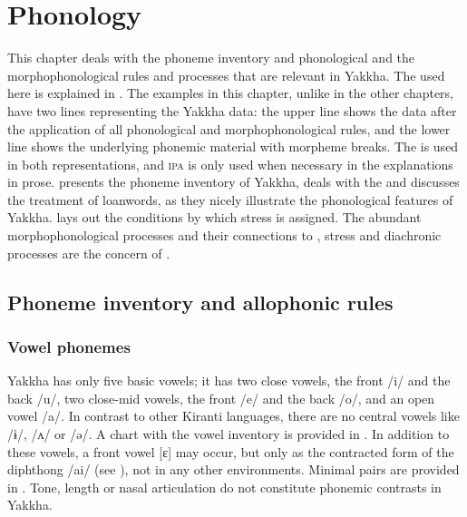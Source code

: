 \chapter{Phonology}\label{phon}


This chapter deals with the phoneme inventory and phonological and the morpho\-phonological rules and processes that are relevant in Yakkha. The  used here is explained  in . The examples in this chapter, unlike in the other chapters, have two lines representing the Yakkha data: the upper line shows the data after the application of all phonological and morphophonological rules, and the lower line shows the underlying phonemic material with morpheme breaks. The  is used in both representations, and \textsc{ipa} is only used when necessary in the explanations in prose.  presents the phoneme inventory of Yakkha,    deals with the  and   discusses the treatment of loanwords, as they nicely illustrate the phonological features of Yakkha.  lays out the conditions by which stress is assigned. The abundant morphophonological processes and their connections to , stress and diachronic processes are the concern of . 


\section{Phoneme inventory and allophonic rules}\label{phon-inv}

\subsection{Vowel phonemes}\label{vowelphon}

Yakkha has only five basic vowels; it has two close vowels, the front /i/ and the back /u/, two close-mid vowels, the front /e/ and the back /o/, and an open vowel /a/. In contrast to other Kiranti languages,  there are no central vowels like  /ɨ/, /ʌ/ or /ə/. A chart with the vowel inventory is provided in . In addition to these vowels, a  front vowel [ɛ] may occur, but only as the  contracted form of the diphthong /ai/ (see ), not in any other environments. Minimal pairs are provided in . Tone, length or nasal articulation do not constitute phonemic contrasts in Yakkha. 

